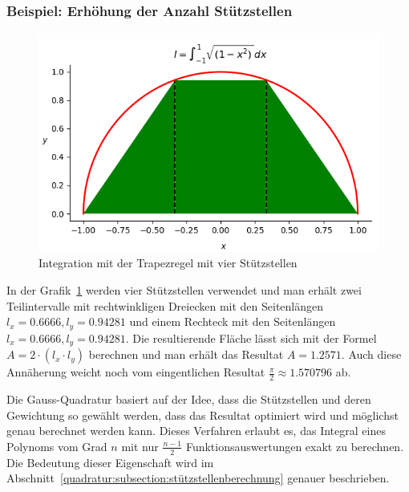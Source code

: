\subsubsection{Beispiel: Erhöhung der Anzahl Stützstellen}
\begin{figure}
    \centering
    \includegraphics[scale=0.7]{papers/quadratur/figures/GaussTrapez2}
    \caption{Integration mit der Trapezregel mit vier Stützstellen
    \label{quadratur:figure:trapez2}}  
\end{figure}
In der Grafik~\ref{quadratur:figure:trapez2} werden vier Stützstellen verwendet und man erhält zwei Teilintervalle mit 
rechtwinkligen Dreiecken mit den Seitenlängen $l_{x}=0.6666, l_{y}=0.94281$ und einem Rechteck mit den Seitenlängen
$l_{x}=0.6666, l_{y}=0.94281$. 
Die resultierende Fläche lässt sich mit der Formel $A= 2\cdot (l_{x} \cdot l_{y})$ berechnen 
und man erhält das Resultat $A=1.2571$.
Auch diese Annäherung weicht noch vom eingentlichen Resultat $\frac{\pi}{2} \approx 1.570796$ ab.

Die Gauss-Quadratur basiert auf der Idee, dass die Stützstellen und deren Gewichtung so gewählt werden,
dass das Resultat optimiert wird und möglichst genau berechnet werden kann.
Dieses Verfahren erlaubt es, das Integral eines Polynoms vom Grad $n$ mit nur $\frac{n-1}{2}$
Funktionsauswertungen exakt zu berechnen.
Die Bedeutung dieser Eigenschaft wird im Abschnitt~\ref{quadratur:subsection:stützstellenberechnung} genauer beschrieben.

